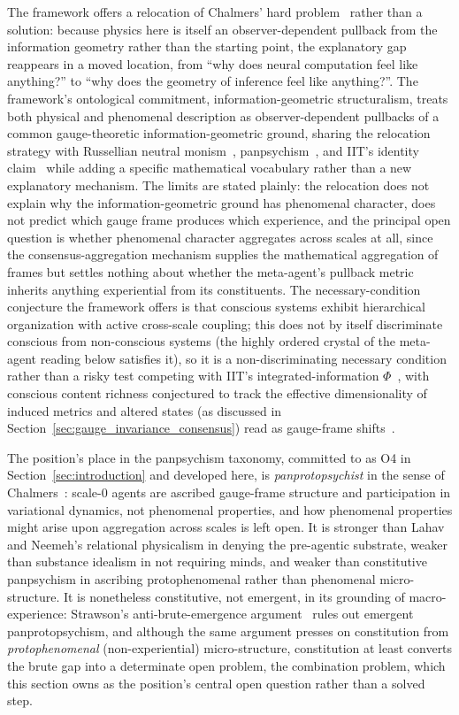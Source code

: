 \documentclass[11pt]{article}
\begin{document}
The framework offers a relocation of Chalmers' hard problem~\cite{Chalmers1995, Chalmers1996} rather than a solution: because physics here is itself an observer-dependent pullback from the information geometry rather than the starting point, the explanatory gap reappears in a moved location, from ``why does neural computation feel like anything?'' to ``why does the geometry of inference feel like anything?''. The framework's ontological commitment, information-geometric structuralism, treats both physical and phenomenal description as observer-dependent pullbacks of a common gauge-theoretic information-geometric ground, sharing the relocation strategy with Russellian neutral monism~\cite{Russell1927, Strawson2006}, panpsychism~\cite{Goff2017, Chalmers2013consciousness}, and IIT's identity claim~\cite{Tononi2008, Tononi2015} while adding a specific mathematical vocabulary rather than a new explanatory mechanism. The limits are stated plainly: the relocation does not explain why the information-geometric ground has phenomenal character, does not predict which gauge frame produces which experience, and the principal open question is whether phenomenal character aggregates across scales at all, since the consensus-aggregation mechanism supplies the mathematical aggregation of frames but settles nothing about whether the meta-agent's pullback metric inherits anything experiential from its constituents. The necessary-condition conjecture the framework offers is that conscious systems exhibit hierarchical organization with active cross-scale coupling; this does not by itself discriminate conscious from non-conscious systems (the highly ordered crystal of the meta-agent reading below satisfies it), so it is a non-discriminating necessary condition rather than a risky test competing with IIT's integrated-information $\Phi$~\cite{Tononi2004, Tononi2016}, with conscious content richness conjectured to track the effective dimensionality of induced metrics and altered states (as discussed in Section~\ref{sec:gauge_invariance_consensus}) read as gauge-frame shifts~\cite{Carhart-Harris2014, Milliere2018}.

The position's place in the panpsychism taxonomy, committed to as O4 in Section~\ref{sec:introduction} and developed here, is \emph{panprotopsychist} in the sense of Chalmers~\cite{Chalmers2013consciousness, Chalmers2016}: scale-0 agents are ascribed gauge-frame structure and participation in variational dynamics, not phenomenal properties, and how phenomenal properties might arise upon aggregation across scales is left open. It is stronger than Lahav and Neemeh's relational physicalism in denying the pre-agentic substrate, weaker than substance idealism in not requiring minds, and weaker than constitutive panpsychism in ascribing protophenomenal rather than phenomenal micro-structure. It is nonetheless constitutive, not emergent, in its grounding of macro-experience: Strawson's anti-brute-emergence argument~\cite{Strawson2006} rules out emergent panprotopsychism, and although the same argument presses on constitution from \emph{protophenomenal} (non-experiential) micro-structure, constitution at least converts the brute gap into a determinate open problem, the combination problem, which this section owns as the position's central open question rather than a solved step.
\end{document}
